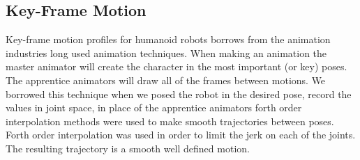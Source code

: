 \subsection{Key-Frame Motion}

Key-frame motion profiles for humanoid robots borrows from the animation industries long used animation techniques.  When making an animation the master animator will create the character in the most important (or key) poses.  The apprentice animators will draw all of the frames between motions.  We borrowed this technique when we posed the robot in the desired pose, record the values in joint space, in place of the apprentice animators forth order interpolation methods were used to make smooth trajectories between poses.  Forth order interpolation was used in order to limit the jerk on each of the joints.  The resulting trajectory is a smooth well defined motion.